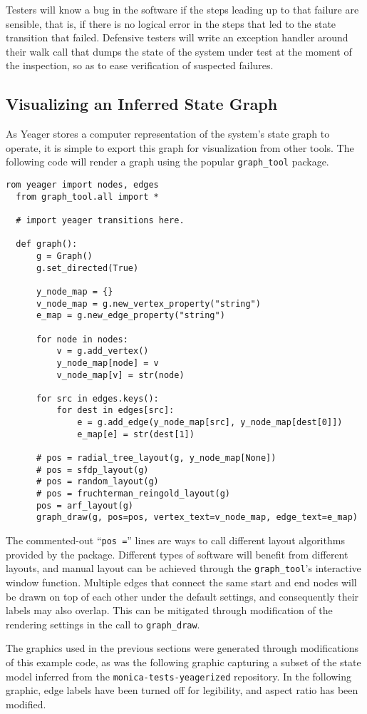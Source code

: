 Testers will know a bug in the software if the steps leading up to that failure are sensible, that is, if there is no logical error in the steps that led to the state transition that failed. Defensive testers will write an exception handler around their walk call that dumps the state of the system under test at the moment of the inspection, so as to ease verification of suspected failures.

\subsection{Visualizing an Inferred State Graph}

As Yeager stores a computer representation of the system's state graph to operate, it is simple to export this graph for visualization from other tools. The following code will render a graph using the popular \texttt{graph\_tool} package.

\begin{Verbatim}[fontsize=\small, baselinestretch=0.75]
  rom yeager import nodes, edges
  from graph_tool.all import *

  # import yeager transitions here.

  def graph():
      g = Graph()
      g.set_directed(True)

      y_node_map = {}
      v_node_map = g.new_vertex_property("string")
      e_map = g.new_edge_property("string")

      for node in nodes:
          v = g.add_vertex()
          y_node_map[node] = v
          v_node_map[v] = str(node)

      for src in edges.keys():
          for dest in edges[src]:
              e = g.add_edge(y_node_map[src], y_node_map[dest[0]])
              e_map[e] = str(dest[1])

      # pos = radial_tree_layout(g, y_node_map[None])
      # pos = sfdp_layout(g)
      # pos = random_layout(g)
      # pos = fruchterman_reingold_layout(g)
      pos = arf_layout(g)
      graph_draw(g, pos=pos, vertex_text=v_node_map, edge_text=e_map)
\end{Verbatim}

The commented-out ``\texttt{pos =}'' lines are ways to call different layout algorithms provided by the package. Different types of software will benefit from different layouts, and manual layout can be achieved through the \texttt{graph\_tool}'s interactive window function. Multiple edges that connect the same start and end nodes will be drawn on top of each other under the default settings, and consequently their labels may also overlap. This can be mitigated through modification of the rendering settings in the call to \texttt{graph\_draw}.

The graphics used in the previous sections were generated through modifications of this example code, as was the following graphic capturing a subset of the state model inferred from the \texttt{monica-tests-yeagerized} repository. In the following graphic, edge labels have been turned off for legibility, and aspect ratio has been modified.

\noindent{}
